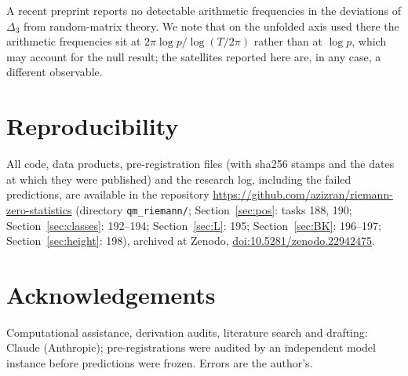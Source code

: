 \documentclass[12pt]{amsart}
\begin{document}
A recent preprint \cite{Kan26} reports no detectable arithmetic
frequencies in the deviations of $\Delta_3$ from random-matrix theory.
We note that on the unfolded axis used there the arithmetic frequencies
sit at $2\pi\log p/\log(T/2\pi)$ rather than at $\log p$, which may account
for the null result; the satellites reported here are, in any case, a
different observable.

\section*{Reproducibility}

All code, data products, pre-registration files (with sha256 stamps and
the dates at which they were published) and the research log, including
the failed predictions, are available in the repository
\url{https://github.com/azizran/riemann-zero-statistics} (directory
\texttt{qm\_riemann/}; Section~\ref{sec:pos}: tasks 188, 190;
Section~\ref{sec:classes}: 192--194; Section~\ref{sec:L}: 195;
Section~\ref{sec:BK}: 196--197; Section~\ref{sec:height}: 198), archived at Zenodo,
\href{https://doi.org/10.5281/zenodo.22942475}{doi:10.5281/zenodo.22942475}.

\section*{Acknowledgements}

Computational assistance, derivation audits, literature search and
drafting: Claude (Anthropic); pre-registrations were audited by an
independent model instance before predictions were frozen. Errors are
the author's.
\end{document}
